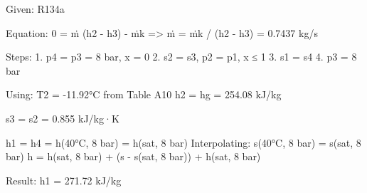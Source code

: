 Given: R134a  

Equation:  
0 = ṁ (h2 - h3) - ṁk  
=> ṁ = ṁk / (h2 - h3) = 0.7437 kg/s  

Steps:  
1. p4 = p3 = 8 bar, x = 0  
2. s2 = s3, p2 = p1, x ≤ 1  
3. s1 = s4  
4. p3 = 8 bar  

Using:  
T2 = -11.92°C from Table A10  
h2 = hg = 254.08 kJ/kg  

s3 = s2 = 0.855 kJ/kg·K  

h1 = h4 = h(40°C, 8 bar) = h(sat, 8 bar)  
Interpolating:  
s(40°C, 8 bar) = s(sat, 8 bar)  
h = h(sat, 8 bar) + (s - s(sat, 8 bar)) + h(sat, 8 bar)  

Result:  
h1 = 271.72 kJ/kg